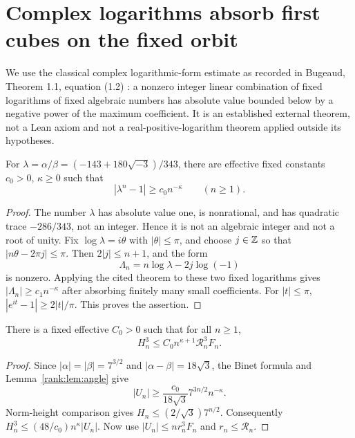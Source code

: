 \section{Complex logarithms absorb first cubes on the fixed orbit}
We use the classical complex logarithmic-form estimate as recorded in Bugeaud, Theorem 1.1, equation (1.2) \cite{rank:bugeaud}: a nonzero integer linear combination of fixed logarithms of fixed algebraic numbers has absolute value bounded below by a negative power of the maximum coefficient. It is an established external theorem, not a Lean axiom and not a real-positive-logarithm theorem applied outside its hypotheses.

\begin{lemma}\label{rank:lem:angle}
For $\lambda=\alpha/\beta=(-143+180\sqrt{-3})/343$, there are effective fixed constants $c_0>0$, $\kappa\ge0$ such that
\[
 |\lambda^n-1|\ge c_0n^{-\kappa}\qquad(n\ge1).
\]
\end{lemma}
\begin{proof}
The number $\lambda$ has absolute value one, is nonrational, and has quadratic trace $-286/343$, not an integer. Hence it is not an algebraic integer and not a root of unity. Fix $\log\lambda=i\theta$ with $|\theta|\le\pi$, and choose $j\in\mathbb Z$ so that $|n\theta-2\pi j|\le\pi$. Then $2|j|\le n+1$, and the form
\[
 \Lambda_n=n\log\lambda-2j\log(-1)
\]
is nonzero. Applying the cited theorem to these two fixed logarithms gives $|\Lambda_n|\ge c_1n^{-\kappa}$ after absorbing finitely many small coefficients. For $|t|\le\pi$, $|e^{it}-1|\ge2|t|/\pi$. This proves the assertion.
\end{proof}

\begin{theorem}\label{rank:thm:three}
There is a fixed effective $C_0>0$ such that for all $n\ge1$,
\[
 H_n^3\le C_0 n^{\kappa+1}\mathscr R_n^3 F_n.
\]
\end{theorem}
\begin{proof}
Since $|\alpha|=|\beta|=7^{3/2}$ and $|\alpha-\beta|=18\sqrt3$, the Binet formula and Lemma~\ref{rank:lem:angle} give
\[
 |U_n|\ge\frac{c_0}{18\sqrt3}7^{3n/2}n^{-\kappa}.
\]
Norm-height comparison gives $H_n\le(2/\sqrt3)7^{n/2}$. Consequently $H_n^3\le(48/c_0)n^\kappa|U_n|$. Now use $|U_n|\le n r_n^3F_n$ and $r_n\le\mathscr R_n$.
\end{proof}

